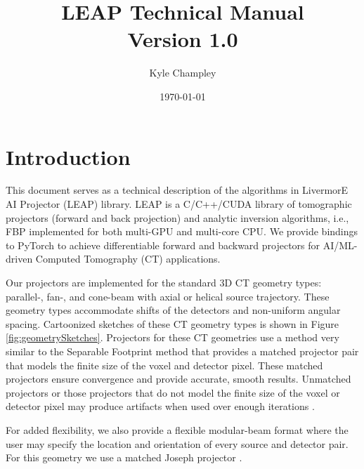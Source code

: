 \documentclass[11pt]{article}
\title{LEAP Technical Manual \\ Version 1.0}
\author{Kyle Champley}
\date{\today}
\begin{document}
\newcommand{\B}[1]{\textbf{#1}}
\newcommand{\ra}{\rightarrow}
\newcommand{\sinc}{\text{sinc}}
\newcommand{\supp}{\text{supp}}
\newcommand{\suppe}{\text{supp}_{\varepsilon}}
\newcommand{\ind}{\B{1}}
\newcommand{\sgn}{\text{sgn}}
\newcommand{\etal}{\text{et al. }}
\newcommand{\Beta}{{\boldsymbol\beta}}
\newcommand{\Radon}{\mathcal{R}}
\newcommand{\Xray}{\mathcal{P}}
\newcommand{\Fourier}{\mathcal{F}}
\newcommand{\Hilbert}{\mathcal{H}}
\newcommand{\Identity}{\mathcal{I}}
\newcommand{\BL}{\mathcal{L}}
\newcommand{\R}{\mathcal{R}}
\newcommand{\Cov}{\text{Cov}}
\newcommand{\argmin}{\operatorname{argmin}}


\maketitle

\newpage
\tableofcontents
\newpage

\section{Introduction}

This document serves as a technical description of the algorithms in LivermorE AI Projector (LEAP) library.  LEAP is a C/C++/CUDA library of tomographic projectors (forward and back projection) and analytic inversion algorithms, i.e., FBP implemented for both multi-GPU and multi-core CPU. We provide bindings to PyTorch to achieve differentiable forward and backward projectors for AI/ML-driven Computed Tomography (CT) applications.

Our projectors are implemented for the standard 3D CT geometry types: parallel-, fan-, and cone-beam with axial or helical source trajectory. These geometry types accommodate shifts of the detectors and non-uniform angular spacing. Cartoonized sketches of these CT geometry types is shown in Figure \ref{fig:geometrySketches}. Projectors for these CT geometries use a method very similar to the Separable Footprint method \cite{Long_TMI_2010} that provides a matched projector pair that models the finite size of the voxel and detector pixel. These matched projectors ensure convergence and provide accurate, smooth results. Unmatched projectors or those projectors that do not model the finite size of the voxel or detector pixel may produce artifacts when used over enough iterations \cite{DeManBasu_PMB_2004}.

For added flexibility, we also provide a flexible modular-beam format where the user may specify the location and orientation of every source and detector pair.  For this geometry we use a matched Joseph projector \cite{Joseph_TMI_1982}.
\end{document}
